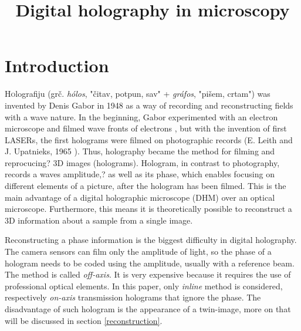 \documentclass[hidelinks]{ferseminareng}
\title{Digital holography in microscopy}
\begin{document}
	\umetninaslov
	
	\section{Introduction}
	\lettrine[nindent=0em,lines=2]{H}olografiju (grč. \textit{hólos}, "čitav, potpun, sav" + \textit{gráfos}, "pišem, crtam") was invented by Denis Gabor in 1948 as a way of recording and reconstructing fields with a wave nature. In the beginning, Gabor experimented with an electron microscope and filmed wave fronts of electrons \cite{gabor1948new}, but with the invention of first LASERs, the first holograms were filmed on photographic records (E. Leith and J. Upatnieks, 1965 \cite{leith1965microscopy}). Thus, holography became the method for filming and reprocucing? 3D images (holograms). Hologram, in contrast to photography, records a waves amplitude,? as well as its phase, which enables focusing on different elements of a picture, after the hologram has been filmed. This is the main advantage of a digital holographic microscope (DHM) over an optical microscope. Furthermore, this means it is theoretically possible to reconstruct a 3D information about a sample from a single image.
	
	Reconstructing a phase information is the biggest difficulty in digital holography. The camera sensors can film only the amplitude of light, so the phase of a hologram needs to be coded using the amplitude, usually with a reference beam. The method is called \textit{off-axis}. It is very expensive because it requires the use of professional optical elements. In this paper, only \textit{inline} method is considered, respectively \textit{on-axis} transmission holograms that ignore the phase. The disadvantage of such hologram is the appearance of a twin-image, more on that will be discussed in section \ref{reconstruction}.
	
\end{document}
